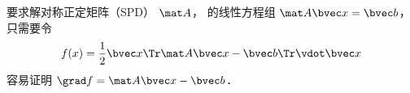 

要求解对称正定矩阵（SPD） $\mat A$， 的线性方程组 $\mat A \bvec x = \bvec b$， 只需要令
\begin{equation}
f(x) = \frac{1}{2}\bvec x\Tr \mat A\bvec x - \bvec b\Tr \vdot \bvec x
\end{equation}
容易证明 $\grad f = \mat A \bvec x - \bvec b$．